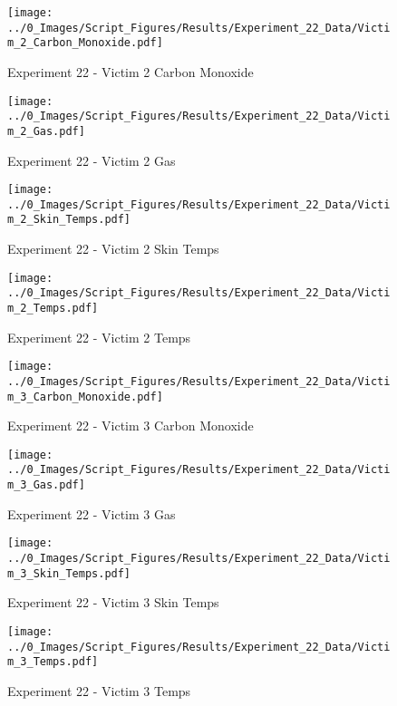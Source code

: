 	\begin{figure}[H]
		\centering
		\texttt{[image: ../0\_Images/Script\_Figures/Results/Experiment\_22\_Data/Victim\_2\_Carbon\_Monoxide.pdf]}
		\caption[]{Experiment 22 - Victim 2 Carbon Monoxide}
	\end{figure}
 
	\clearpage

	\begin{figure}[H]
		\centering
		\texttt{[image: ../0\_Images/Script\_Figures/Results/Experiment\_22\_Data/Victim\_2\_Gas.pdf]}
		\caption[]{Experiment 22 - Victim 2 Gas}
	\end{figure}
 

	\begin{figure}[H]
		\centering
		\texttt{[image: ../0\_Images/Script\_Figures/Results/Experiment\_22\_Data/Victim\_2\_Skin\_Temps.pdf]}
		\caption[]{Experiment 22 - Victim 2 Skin Temps}
	\end{figure}
 
	\clearpage

	\begin{figure}[H]
		\centering
		\texttt{[image: ../0\_Images/Script\_Figures/Results/Experiment\_22\_Data/Victim\_2\_Temps.pdf]}
		\caption[]{Experiment 22 - Victim 2 Temps}
	\end{figure}
 

	\begin{figure}[H]
		\centering
		\texttt{[image: ../0\_Images/Script\_Figures/Results/Experiment\_22\_Data/Victim\_3\_Carbon\_Monoxide.pdf]}
		\caption[]{Experiment 22 - Victim 3 Carbon Monoxide}
	\end{figure}
 
	\clearpage

	\begin{figure}[H]
		\centering
		\texttt{[image: ../0\_Images/Script\_Figures/Results/Experiment\_22\_Data/Victim\_3\_Gas.pdf]}
		\caption[]{Experiment 22 - Victim 3 Gas}
	\end{figure}
 

	\begin{figure}[H]
		\centering
		\texttt{[image: ../0\_Images/Script\_Figures/Results/Experiment\_22\_Data/Victim\_3\_Skin\_Temps.pdf]}
		\caption[]{Experiment 22 - Victim 3 Skin Temps}
	\end{figure}
 
	\clearpage

	\begin{figure}[H]
		\centering
		\texttt{[image: ../0\_Images/Script\_Figures/Results/Experiment\_22\_Data/Victim\_3\_Temps.pdf]}
		\caption[]{Experiment 22 - Victim 3 Temps}
	\end{figure}
 

